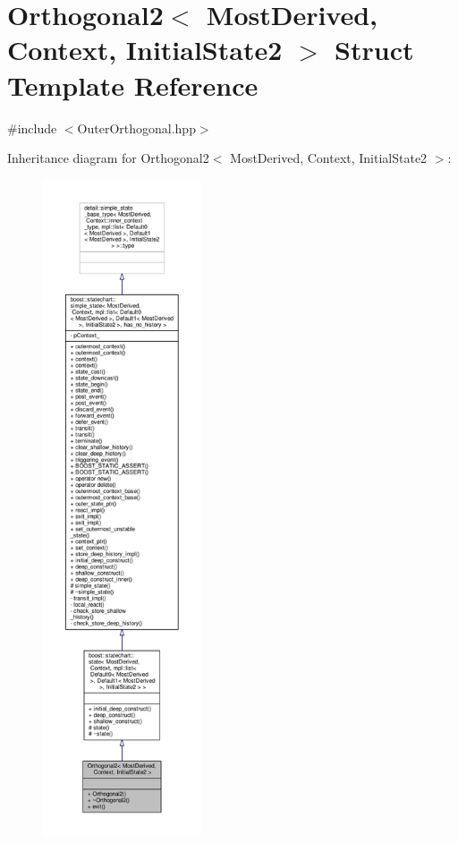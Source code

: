 \hypertarget{struct_orthogonal2}{}\section{Orthogonal2$<$ Most\+Derived, Context, Initial\+State2 $>$ Struct Template Reference}
\label{struct_orthogonal2}


{\ttfamily \#include $<$Outer\+Orthogonal.\+hpp$>$}



Inheritance diagram for Orthogonal2$<$ Most\+Derived, Context, Initial\+State2 $>$\+:
\nopagebreak
\begin{figure}[H]
\begin{center}
\leavevmode
\includegraphics[height=550pt]{struct_orthogonal2__inherit__graph}
\end{center}
\end{figure}


